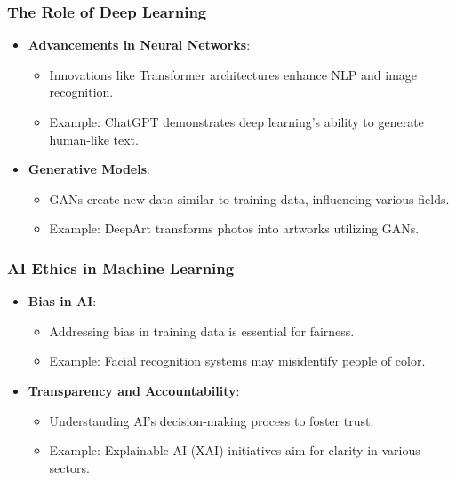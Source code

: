 \documentclass[aspectratio=169]{beamer}
\begin{document}
\begin{frame}[fragile]
    \frametitle{The Role of Deep Learning}
    \begin{itemize}
        \item \textbf{Advancements in Neural Networks}:
            \begin{itemize}
                \item Innovations like Transformer architectures enhance NLP and image recognition.
                \item Example: ChatGPT demonstrates deep learning's ability to generate human-like text.
            \end{itemize}

        \item \textbf{Generative Models}:
            \begin{itemize}
                \item GANs create new data similar to training data, influencing various fields.
                \item Example: DeepArt transforms photos into artworks utilizing GANs.
            \end{itemize}
    \end{itemize}
\end{frame}

\begin{frame}[fragile]
    \frametitle{AI Ethics in Machine Learning}
    \begin{itemize}
        \item \textbf{Bias in AI}:
            \begin{itemize}
                \item Addressing bias in training data is essential for fairness.
                \item Example: Facial recognition systems may misidentify people of color.
            \end{itemize}

        \item \textbf{Transparency and Accountability}:
            \begin{itemize}
                \item Understanding AI's decision-making process to foster trust.
                \item Example: Explainable AI (XAI) initiatives aim for clarity in various sectors.
            \end{itemize}
    \end{itemize}
\end{frame}
\end{document}
